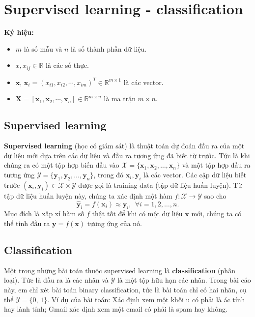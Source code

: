 \documentclass[]{article}
\title{}
\author{}
\begin{document}

%

\section{Supervised learning - classification}
\noindent \textbf{Ký hiệu:}
\begin{itemize}
	\item $m$ là số mẫu và $n$ là số thành phần dữ liệu.
	\item $x, x_{ij}\in \mathbb{R}$ là các số thực.
	\item $\textbf{x},\, \textbf{x}_i =\left(x_{i1}, x_{i2},\cdots, x_{im}\right)^T \in \mathbb{R}^{m\times 1}$ là các vector.
	\item $\textbf{X}=[\textbf{x}_1, \textbf{x}_2, \cdots, \textbf{x}_n]\in \mathbb{R}^{m\times n}$ là ma trận $m\times n$.
\end{itemize}
\subsection{Supervised learning}
\textbf{Supervised learning} (học có giám sát) là thuật toán dự đoán đầu ra của một dữ liệu mới dựa trên các dữ liệu và đầu ra tương ứng đã biết từ trước. Tức là khi chúng ra có một tập hợp biến đầu vào $\mathcal{X} = \{\mathbf{x}_1, \mathbf{x}_2, \dots, \mathbf{x}_n\}$ và một tập hợp đầu ra tương ứng $\mathcal{Y} = \{\mathbf{y}_1, \mathbf{y}_2, \dots, \mathbf{y}_n\}$, trong đó $\mathbf{x}_i, \mathbf{y}_i$ là các vector. Các cặp dữ liệu biết trước $(\mathbf{x}_i, \mathbf{y}_i) \in \mathcal{X} \times \mathcal{Y}$ được gọi là training data (tập dữ liệu huấn luyện). Từ tập dữ liệu huấn luyện này, chúng ta xác định một hàm $f:\mathcal{X}\to \mathcal{Y}$ sao cho
$$\hat{\mathbf{y}}_i = f(\mathbf{x}_i) \approx \textbf{y}_i, ~~ \forall i = 1, 2, \dots, n.$$
Mục đích là xấp xỉ hàm số $f$ thật tốt để khi có một dữ liệu 
$\mathbf{x}$ mới, chúng ta có thể tính đầu ra $\textbf{y}=f(\textbf{x})$ tương ứng của nó.

\subsection{Classification}
Một trong những bài toán thuộc supervised learning là \textbf{classification} (phân loại). Tức là đầu ra là các nhãn và $\mathcal{Y}$ là một tập hữu hạn các nhãn. Trong bài cáo này, em chỉ xét bài toán binary classification, tức là bài toán chỉ có hai nhãn, cụ thể $\mathcal{Y}=\{0,\,1\}$. Ví dụ của bài toán: Xác định xem một khối u có phải là ác tính hay lành tính; Gmail xác định xem một email có phải là spam hay không.
\end{document}
